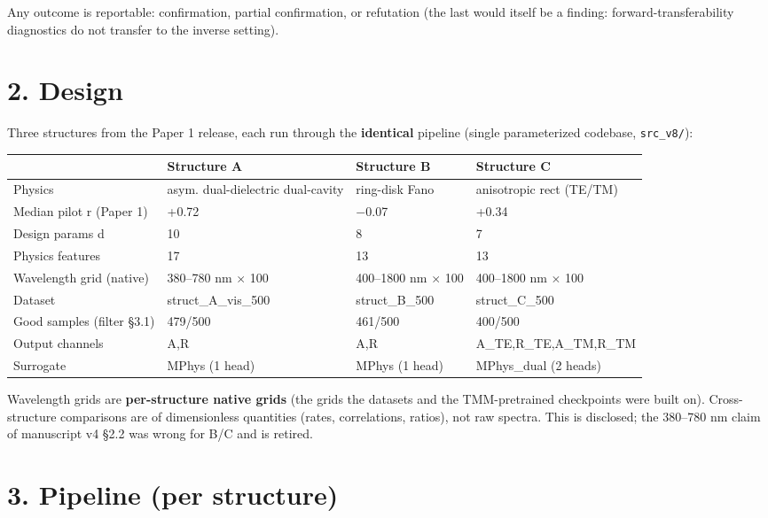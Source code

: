 \documentclass[11pt,a4paper]{article}
\newcounter{none}   %
\begin{document}
Any outcome is reportable: confirmation, partial confirmation, or refutation
(the last would itself be a finding: forward-transferability diagnostics do
not transfer to the inverse setting).

\section*{2. Design}

Three structures from the Paper 1 release, each run through the \textbf{identical}
pipeline (single parameterized codebase, \texttt{src\_v8/}):

\begingroup
\setlength{\tabcolsep}{3pt}\footnotesize
{}
\label{tab:4}
{\def\LTcaptype{none} %
\begin{longtable}[]{@{}llll@{}}
\toprule\noalign{} & Structure A & Structure B & Structure C \\
\midrule\noalign{}
\endhead
\bottomrule\noalign{}
\endlastfoot
Physics & asym. dual-dielectric dual-cavity & ring-disk Fano & anisotropic rect (TE/TM) \\
Median pilot r (Paper 1) & +0.72 & \ensuremath{-}0.07 & +0.34 \\
Design params d & 10 & 8 & 7 \\
Physics features & 17 & 13 & 13 \\
Wavelength grid (native) & 380--780 nm \ensuremath{\times} 100 & 400--1800 nm \ensuremath{\times} 100 & 400--1800 nm \ensuremath{\times} 100 \\
Dataset & struct\_A\_vis\_500 & struct\_B\_500 & struct\_C\_500 \\
Good samples (filter \S{}3.1) & 479/500 & 461/500 & 400/500 \\
Output channels & A,R & A,R & A\_TE,R\_TE,A\_TM,R\_TM \\
Surrogate & MPhys (1 head) & MPhys (1 head) & MPhys\_dual (2 heads) \\
\end{longtable}
}
\endgroup

Wavelength grids are \textbf{per-structure native grids} (the grids the datasets
and the TMM-pretrained checkpoints were built on). Cross-structure comparisons
are of dimensionless quantities (rates, correlations, ratios), not raw spectra.
This is disclosed; the 380--780 nm claim of manuscript v4 \S{}2.2 was wrong for
B/C and is retired.

\section*{3. Pipeline (per structure)}
\end{document}
